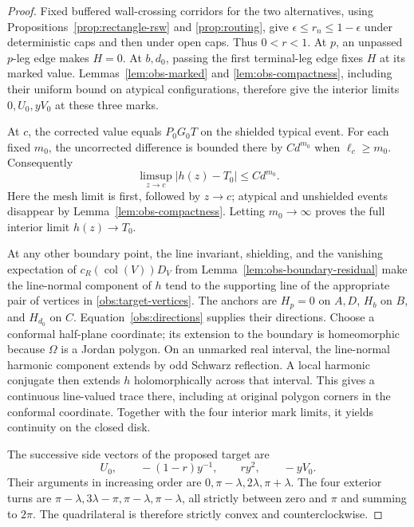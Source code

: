 \begin{proof}
Fixed buffered wall-crossing corridors for the two alternatives,
using Propositions~\ref{prop:rectangle-rsw} and \ref{prop:routing},
give $\epsilon\le r_n\le1-\epsilon$ under deterministic caps and
then under open caps.  Thus $0<r<1$.
At $p$, an unpassed $p$-leg edge makes $H=0$.  At $b,d_0$,
passing the first terminal-leg edge fixes $H$ at its marked value.
Lemmas~\ref{lem:obs-marked} and \ref{lem:obs-compactness}, including
their uniform bound on atypical configurations, therefore give the
interior limits $0,U_0,yV_0$ at these three marks.

At $c$, the corrected value equals $P_0G_0T$ on the shielded
typical event.  For each fixed $m_0$, the uncorrected difference is
bounded there by $Cd^{m_0}$ when $\ell_c\ge m_0$.  Consequently
\begin{equation}
 \limsup_{z\to c}|h(z)-T_0|\le Cd^{m_0}.
 \label{obs:c-limit-bound}
\end{equation}
Here the mesh limit is first, followed by $z\to c$; atypical and
unshielded events disappear by Lemma~\ref{lem:obs-compactness}.
Letting $m_0\to\infty$ proves the full interior limit $h(z)\to T_0$.

At any other boundary point, the line invariant, shielding, and
the vanishing expectation of $c_R(\operatorname{col}(V))D_V$ from
Lemma~\ref{lem:obs-boundary-residual} make the line-normal
component of $h$ tend to the supporting line of the appropriate
pair of vertices in \eqref{obs:target-vertices}.  The anchors are
$H_p=0$ on $A,D$, $H_b$ on $B$, and $H_{d_0}$ on $C$.
Equation~\eqref{obs:directions} supplies their directions.
Choose a conformal half-plane coordinate; its extension to the
boundary is homeomorphic because $\Omega$ is a Jordan polygon.
On an unmarked real interval, the line-normal harmonic component
extends by odd Schwarz reflection.  A local harmonic conjugate
then extends $h$ holomorphically across that interval.  This gives
a continuous line-valued trace there, including at original polygon
corners in the conformal coordinate.  Together with the four
interior mark limits, it yields continuity on the closed disk.

The successive side vectors of the proposed target are
\begin{equation}
 U_0,\qquad -(1-r)y^{-1},\qquad ry^2,\qquad -yV_0.
 \label{obs:side-vectors}
\end{equation}
Their arguments in increasing order are
$0,\pi-\lambda,2\lambda,\pi+\lambda$.  The four exterior turns
are $\pi-\lambda,3\lambda-\pi,\pi-\lambda,\pi-\lambda$,
all strictly between zero and $\pi$ and summing to $2\pi$.
The quadrilateral is therefore strictly convex and counterclockwise.


\end{proof}
